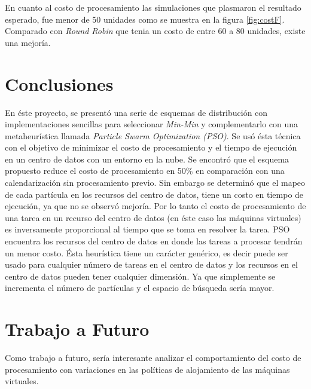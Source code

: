 \documentclass[jou,apacite]{apa6}
\begin{document}
En cuanto al costo de procesamiento las simulaciones que plasmaron el resultado esperado, fue menor de 50 unidades como se muestra en la figura \ref{fig:costF}. Comparado con \textit{Round Robin} que tenia un costo de entre 60 a 80 unidades, existe una mejoría.

\section{Conclusiones}

En éste proyecto, se presentó una serie de esquemas de distribución con implementaciones sencillas para seleccionar \textit{Min-Min} y complementarlo con una metaheurística  llamada \textit{Particle Swarm Optimization (PSO)}. Se usó ésta técnica con el objetivo de minimizar el costo de procesamiento y el tiempo de ejecución en un centro de datos con un entorno en la nube. Se encontró que el esquema propuesto reduce el costo de procesamiento en 50\% en comparación con una calendarización sin procesamiento previo. Sin embargo se determinó que el mapeo de cada partícula en los recursos del centro de datos, tiene un costo en tiempo de ejecución, ya que no se observó mejoría. Por lo tanto el costo de procesamiento de una tarea en un recurso del centro de datos (en éste caso las máquinas virtuales) es inversamente proporcional al tiempo que se toma en resolver la tarea.
PSO encuentra los recursos del centro de datos en donde las tareas a procesar tendrán un menor costo. Ésta heurística tiene un carácter genérico, es decir puede ser usado para cualquier número de tareas en el centro de datos y los recursos en el centro de datos pueden tener cualquier dimensión. Ya que simplemente se incrementa el número de partículas y el espacio de búsqueda sería mayor.

\section{Trabajo a Futuro}

Como trabajo a futuro, sería interesante analizar el comportamiento del costo de procesamiento con variaciones en las políticas de alojamiento de las máquinas virtuales.


\end{document}
